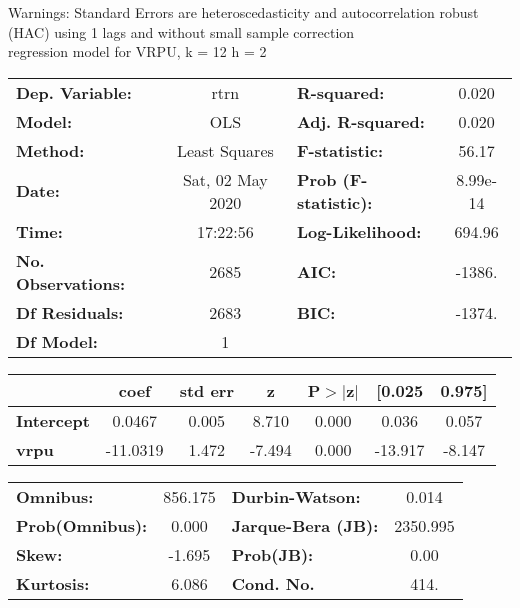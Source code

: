 Warnings: \newline
 [1] Standard Errors are heteroscedasticity and autocorrelation robust (HAC) using 1 lags and without small sample correction\\ 

regression model for VRPU, k = 12 h = 2\begin{center}
\begin{tabular}{lclc}
\toprule
\textbf{Dep. Variable:}    &       rtrn       & \textbf{  R-squared:         } &     0.020   \\
\textbf{Model:}            &       OLS        & \textbf{  Adj. R-squared:    } &     0.020   \\
\textbf{Method:}           &  Least Squares   & \textbf{  F-statistic:       } &     56.17   \\
\textbf{Date:}             & Sat, 02 May 2020 & \textbf{  Prob (F-statistic):} &  8.99e-14   \\
\textbf{Time:}             &     17:22:56     & \textbf{  Log-Likelihood:    } &    694.96   \\
\textbf{No. Observations:} &        2685      & \textbf{  AIC:               } &    -1386.   \\
\textbf{Df Residuals:}     &        2683      & \textbf{  BIC:               } &    -1374.   \\
\textbf{Df Model:}         &           1      & \textbf{                     } &             \\
\bottomrule
\end{tabular}
\begin{tabular}{lcccccc}
                   & \textbf{coef} & \textbf{std err} & \textbf{z} & \textbf{P$> |$z$|$} & \textbf{[0.025} & \textbf{0.975]}  \\
\midrule
\textbf{Intercept} &       0.0467  &        0.005     &     8.710  &         0.000        &        0.036    &        0.057     \\
\textbf{vrpu}      &     -11.0319  &        1.472     &    -7.494  &         0.000        &      -13.917    &       -8.147     \\
\bottomrule
\end{tabular}
\begin{tabular}{lclc}
\textbf{Omnibus:}       & 856.175 & \textbf{  Durbin-Watson:     } &    0.014  \\
\textbf{Prob(Omnibus):} &   0.000 & \textbf{  Jarque-Bera (JB):  } & 2350.995  \\
\textbf{Skew:}          &  -1.695 & \textbf{  Prob(JB):          } &     0.00  \\
\textbf{Kurtosis:}      &   6.086 & \textbf{  Cond. No.          } &     414.  \\
\bottomrule
\end{tabular}
\end{center}


